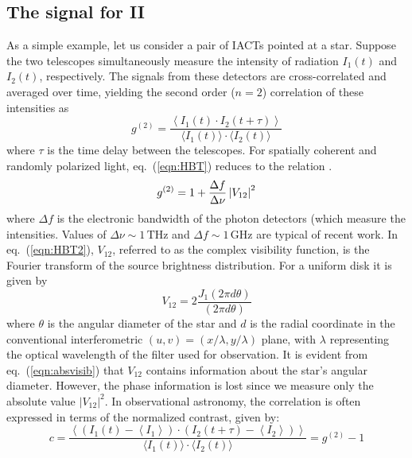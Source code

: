 \subsection{The signal for II}\label{sec:signal}
As a simple example, let us consider a pair of IACTs pointed at a star. Suppose the two telescopes simultaneously measure the intensity of radiation $I_1(t)$ and $I_2(t)$, respectively. The signals from these detectors are cross-correlated and averaged over time, yielding the second order ($n=2$) correlation of these intensities as \citep[cf.~][]{acciari2020optical, dravins2013optical}
\begin{equation}
	g^{(2)}= \frac{\left\langle I_1(t) \cdot I_2(t + \tau) \right\rangle}{\langle I_1(t) \rangle \cdot \langle I_2(t) \rangle} 
	\label{eqn:HBT}
\end{equation}
where $\tau$ is the time delay between the telescopes. For spatially coherent and randomly polarized light, eq.~(\ref{eqn:HBT}) reduces to the relation \citep[sometimes called the Siegert relation, see e.g.~][]{acciari2020optical}.
\begin{equation}
	g^{(2)} = 1 + \frac{\Delta f}{\Delta \nu} \left|V_{12}\right|^2
	\label{eqn:HBT2}
\end{equation}
where $\Delta f$ is the electronic bandwidth of the photon detectors (which measure the intensities.  Values of $\Delta\nu\sim 1\,\mathrm{THz}$ and $\Delta f \sim 1\,\mathrm{GHz}$ are typical of recent work.  In eq.~(\ref{eqn:HBT2}), $V_{12}$, referred to as the complex visibility function, is the Fourier transform of the source brightness distribution. For a uniform disk it is given by
\begin{equation}
 V_{12} = 2 \frac{J_1(2 \pi d \theta)}{(2 \pi d \theta)}
\label{eqn:absvisib}
\end{equation}
where $\theta$ is the angular diameter of the star and $d$ is the radial coordinate in the conventional interferometric $(u , v) = (x/\lambda, y/\lambda)$ plane, with $\lambda$ representing the optical wavelength of the filter used for observation. It is evident from eq.~(\ref{eqn:absvisib}) that $V_{12}$ contains information about the star's angular diameter. However, the phase information is lost since we measure only the absolute value $\vert V_{12} \vert^2$. In observational astronomy, the correlation is often expressed in terms of the normalized contrast, given by:
\begin{equation}
	c = \frac{\left\langle \left( I_1(t) - \left\langle I_1 \right\rangle \right) \cdot \left( I_2(t + \tau) - \left\langle I_2 \right\rangle \right) \right\rangle}{\langle I_1(t) \rangle \cdot \langle I_2(t) \rangle} = g^{(2)} - 1
\end{equation}
